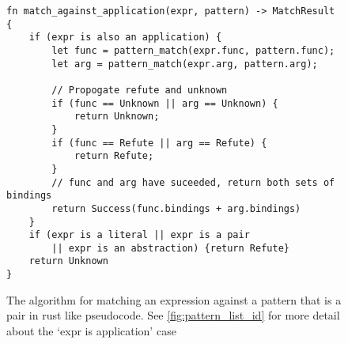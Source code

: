 \begin{figure}[h]
    \begin{lstlisting}[language=Rust_boxed]
fn match_against_application(expr, pattern) -> MatchResult {
    if (expr is also an application) {
        let func = pattern_match(expr.func, pattern.func);
        let arg = pattern_match(expr.arg, pattern.arg);

        // Propogate refute and unknown
        if (func == Unknown || arg == Unknown) {
            return Unknown;
        }
        if (func == Refute || arg == Refute) {
            return Refute;
        }
        // func and arg have suceeded, return both sets of bindings
        return Success(func.bindings + arg.bindings)
    }
    if (expr is a literal || expr is a pair 
        || expr is an abstraction) {return Refute}
    return Unknown
}
\end{lstlisting}
    \caption{The algorithm for matching an expression against a pattern that is a pair in rust like pseudocode. See \ref{fig:pattern_list_id} for more detail about the `expr is application' case}
    \label{fig:pattern_list_app}
\end{figure}
